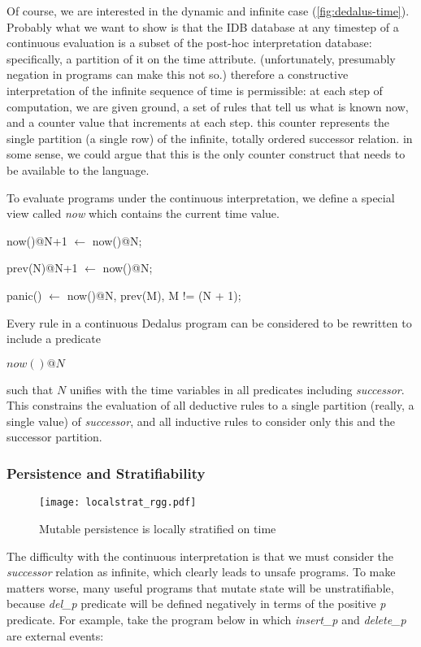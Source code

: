 Of course, we are interested in the dynamic and infinite case (\ref{fig:dedalus-time}).
Probably what we want to show is that the IDB database at any timestep of a continuous evaluation is a subset
of the post-hoc interpretation database: specifically, a partition of it on the time attribute.  (unfortunately, presumably
negation in programs can make this not so.)  therefore a constructive interpretation of the infinite sequence of time is permissible:
at each step of computation, we are given ground, a set of rules that tell us what is known now, and a counter value that increments
at each step.  this counter represents the single partition (a single row) of the infinite, totally ordered successor relation.
in some sense, we could argue that this is the only counter construct that needs to be available to the language.


To evaluate programs under the continuous interpretation, we define a special view called \emph{now} which contains the current 
time value.

\begin{Dedalus}
now()@N+1  \(\leftarrow\)
    now()@N;

prev(N)@N+1  \(\leftarrow\)
    now()@N;

panic()  \(\leftarrow\)
    now()@N,
    prev(M),
    M != (N + 1);
\end{Dedalus}

Every rule in a continuous Dedalus program can be considered to be rewritten to include a predicate

$now()@N$

such that $N$ unifies with the time variables in all predicates including \emph{successor}.  This constrains the evaluation of all deductive 
rules to a single partition (really, a single value) of \emph{successor}, and all inductive rules to consider only this and the successor partition.

\subsubsection{Persistence and Stratifiability}

\begin{figure}[t]
  \centering
  \texttt{[image: localstrat\_rgg.pdf]}
  \label{fig:lstrat}
  \caption{Mutable persistence is locally stratified on time}
\vspace{-8pt}
\end{figure}


The difficulty with the continuous interpretation is that we must consider the \emph{successor} relation as infinite, which clearly leads
to unsafe programs.  To make matters worse, many useful programs that mutate state will be unstratifiable, because \emph{del\_p} predicate
will be defined negatively in terms of the positive \emph{p} predicate.  For example, take the program below in which \emph{insert\_p}
and \emph{delete\_p} are external events:

